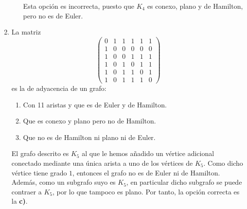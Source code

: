 \begin{ejercicio}
\begin{enumerate}
\begin{enumerate}
            Esta opción es incorrecta, puesto que $K_4$ es conexo, plano y de Hamilton, pero no es de Euler.
        \end{enumerate}
        \item La matriz
        \[
            \begin{pmatrix}
                0 & 1 & 1 & 1 & 1 & 1 \\
                1 & 0 & 0 & 0 & 0 & 0 \\
                1 & 0 & 0 & 1 & 1 & 1 \\
                1 & 0 & 1 & 0 & 1 & 1 \\
                1 & 0 & 1 & 1 & 0 & 1 \\
                1 & 0 & 1 & 1 & 1 & 0
            \end{pmatrix}
        \]
        es la de adyacencia de un grafo:
        \begin{enumerate}
            \item Con 11 aristas y que es de Euler y de Hamilton.
            \item Que es conexo y plano pero no de Hamilton.
            \item Que no es de Hamilton ni plano ni de Euler.
        \end{enumerate}

        El grafo descrito es $K_5$ al que le hemos añadido un vértice adicional conectado mediante una única arista a uno de los vértices de $K_5$. Como dicho vértice tiene grado $1$, entonces el grafo no es de Euler ni de Hamilton. Además, como un subgrafo suyo es $K_5$, en particular dicho subgrafo se puede contraer a $K_5$, por lo que tampoco es plano. Por tanto, la opción correcta es la \textbf{c)}.
    \end{enumerate}
\end{ejercicio}


